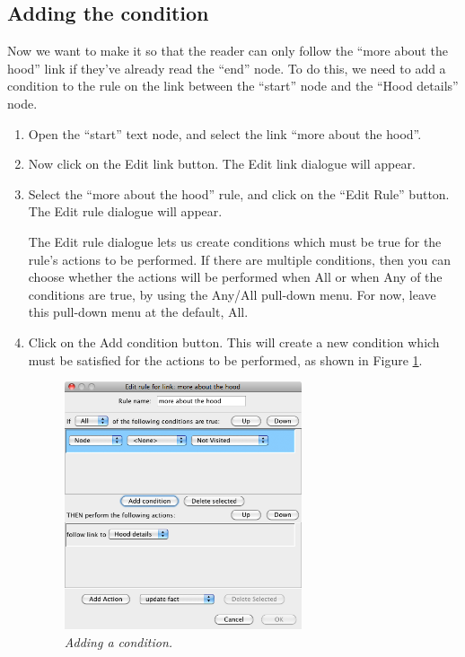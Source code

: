 \documentclass{article}
\begin{document}
\subsection{Adding the condition}

Now we want to make it so that the reader can only follow the ``more about the
hood'' link if they've already read the ``end'' node. To do this, we need to
add a condition to the rule on the link between the ``start'' node and the
``Hood details'' node.

\begin{enumerate}
  \item Open the ``start'' text node, and select the link ``more about the
  hood''.
  \item Now click on the Edit link button. The Edit link dialogue will appear.
  \item Select the ``more about the hood'' rule, and click on the ``Edit Rule''
  button. The Edit rule dialogue will appear.

The Edit rule dialogue lets us create conditions which must be true for the
rule's actions to be performed. If there are multiple conditions, then you can
choose whether the actions will be performed when All or when Any of the
conditions are true, by using the Any/All pull-down menu. For now, leave this
pull-down menu at the default, All.

\item Click on the Add condition button. This will create a new condition which
must be satisfied for the actions to be performed, as shown in Figure
\ref{fig:adding_condition}.
 
\begin{figure}[ht]
  \centering
  \includegraphics[width=7cm]{images/hypedyn-tutorial-1-figure-13}
  \caption{\textit{Adding a condition.}}
  \label{fig:adding_condition}
\end{figure} 


\end{enumerate}
\end{document}
